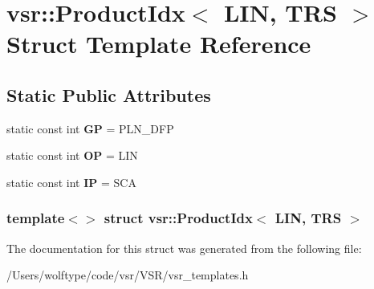 \hypertarget{structvsr_1_1_product_idx_3_01_l_i_n_00_01_t_r_s_01_4}{\section{vsr\-:\-:Product\-Idx$<$ L\-I\-N, T\-R\-S $>$ Struct Template Reference}
\label{structvsr_1_1_product_idx_3_01_l_i_n_00_01_t_r_s_01_4}
}
\subsection*{Static Public Attributes}
\begin{DoxyCompactItemize}
\item 
\hypertarget{structvsr_1_1_product_idx_3_01_l_i_n_00_01_t_r_s_01_4_ad41da13f0616896bfa9df2d8d82d87c1}{static const int {\bfseries G\-P} = P\-L\-N\-\_\-\-D\-F\-P}\label{structvsr_1_1_product_idx_3_01_l_i_n_00_01_t_r_s_01_4_ad41da13f0616896bfa9df2d8d82d87c1}

\item 
\hypertarget{structvsr_1_1_product_idx_3_01_l_i_n_00_01_t_r_s_01_4_ac8c292eeed62242681f2b4280a882e74}{static const int {\bfseries O\-P} = L\-I\-N}\label{structvsr_1_1_product_idx_3_01_l_i_n_00_01_t_r_s_01_4_ac8c292eeed62242681f2b4280a882e74}

\item 
\hypertarget{structvsr_1_1_product_idx_3_01_l_i_n_00_01_t_r_s_01_4_af4313c3e7cd5efa99c8e1a89346ce21d}{static const int {\bfseries I\-P} = S\-C\-A}\label{structvsr_1_1_product_idx_3_01_l_i_n_00_01_t_r_s_01_4_af4313c3e7cd5efa99c8e1a89346ce21d}

\end{DoxyCompactItemize}
\subsubsection*{template$<$$>$ struct vsr\-::\-Product\-Idx$<$ L\-I\-N, T\-R\-S $>$}



The documentation for this struct was generated from the following file\-:\begin{DoxyCompactItemize}
\item 
/\-Users/wolftype/code/vsr/\-V\-S\-R/vsr\-\_\-templates.\-h\end{DoxyCompactItemize}

